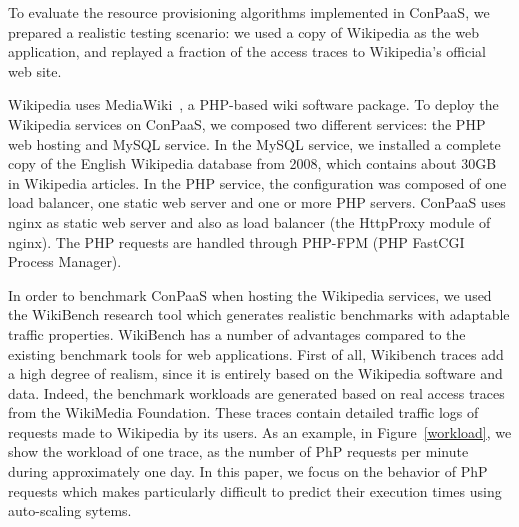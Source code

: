 
To evaluate the resource provisioning algorithms implemented in ConPaaS,
we prepared a realistic testing scenario: we used a copy of Wikipedia as
the web application, and replayed a fraction of the access traces to
Wikipedia's official web site.  

Wikipedia uses MediaWiki~\cite{mediawiki}, a PHP-based wiki software 
package.
To deploy the Wikipedia services on ConPaaS, we composed two different services: the PHP web hosting and MySQL service. In the MySQL service, we installed a complete copy of the English Wikipedia database from 2008, which contains about 30GB in Wikipedia articles.
In the PHP service, the configuration was composed of one load balancer,
one static web server and one or more PHP servers. ConPaaS uses nginx
as static web server and also as load balancer (the HttpProxy module
of nginx). The PHP requests are handled through PHP-FPM (PHP FastCGI
Process Manager).



In order to benchmark ConPaaS when hosting the Wikipedia services, we used the WikiBench research tool which generates realistic benchmarks with adaptable traffic properties. WikiBench has a number of advantages compared to the existing benchmark tools for web applications. First of all, Wikibench traces add a high degree of realism, since it is entirely based on the Wikipedia software and data. Indeed, the benchmark workloads are generated based on real access traces from the WikiMedia Foundation. These traces contain detailed  traffic logs of requests made to Wikipedia by its users. As an example, in Figure~\ref{workload}, we show the workload of one trace, as the number of PhP requests per minute during approximately one day.  In this paper, we focus on the behavior of PhP requests which makes particularly difficult to predict their execution times using auto-scaling sytems. 

